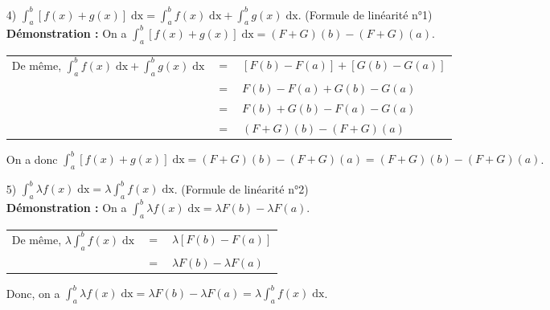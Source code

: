 \begin{itemize}
\item[4)] $\displaystyle \int_a^b \left[f(x) + g\left(x\right)\right] \; \mathrm{dx} = \displaystyle \int_a^b f(x) \; \mathrm{dx} + \displaystyle \int_a^b g(x) \; \mathrm{dx}$. (Formule de linéarité n°1) \\

\textbf{Démonstration :} On a $\displaystyle \int_a^b \left[f(x) + g\left(x\right)\right] \; \mathrm{dx} = \left(F + G\right)\left(b\right) - \left(F + G\right)\left(a\right)$. \\

\begin{tabular}{lll}
\hspace{-.3cm} De même, $\displaystyle \int_a^b f(x) \; \mathrm{dx} + \displaystyle \int_a^b g(x) \; \mathrm{dx}$ & $=$ & $\left[F\left(b\right) - F\left(a\right)\right] + \left[G\left(b\right) - G\left(a\right)\right]$ \\
& $=$ & $F\left(b\right) - F\left(a\right) + G\left(b\right) - G\left(a\right)$ \\
& $=$ & $F\left(b\right) + G\left(b\right) - F\left(a\right) - G\left(a\right)$ \\
& $=$ & $\left(F+G\right)\left(b\right) - \left(F+G\right)\left(a\right)$ \\
\end{tabular}


On a donc $\displaystyle \int_a^b \left[f(x) + g\left(x\right)\right] \; \mathrm{dx} = \left(F + G\right)\left(b\right) - \left(F + G\right)\left(a\right) = \left(F+G\right)\left(b\right) - \left(F+G\right)\left(a\right)$. \\

\item[5)] $\displaystyle \int_a^b \lambda f(x) \; \mathrm{dx} = \lambda \displaystyle \int_a^b f(x) \; \mathrm{dx}$. (Formule de linéarité n°2) \\

\textbf{Démonstration : } On a $\displaystyle \int_a^b \lambda f(x) \; \mathrm{dx} = \lambda F(b) - \lambda F(a)$. \\

\begin{tabular}{lll}
\hspace*{-.3cm} De même, $\lambda \displaystyle \int_a^b f(x) \; \mathrm{dx}$ & $=$ & $\lambda \left[F\left(b\right) - F\left(a\right)\right]$ \\
& $=$ & $\lambda F(b) - \lambda F(a)$ \\
\end{tabular}

\vspace*{-.1cm}

Donc, on a $\displaystyle \int_a^b \lambda f(x) \; \mathrm{dx} = \lambda F(b) - \lambda F(a) = \lambda \displaystyle \int_a^b f(x) \; \mathrm{dx}$.
\end{itemize}

